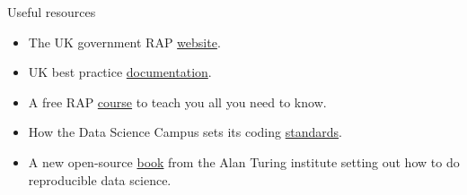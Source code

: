 \documentclass[xcolor=x11names,compress]{beamer}
\renewcommand{\(}{\begin{columns}}
\renewcommand{\)}{\end{columns}}
\newcommand{\<}[1]{\begin{column}{#1}}
\renewcommand{\>}{\end{column}}
\begin{document}

\begin{frame}{Useful resources}
  \begin{itemize}
    \item The UK government RAP \href{https://ukgovdatascience.github.io/rap-website/index.html}{website}.
    \item UK best practice \href{https://gss.civilservice.gov.uk/policy-store/quality-statistics-in-government/\#reproducible-analytical-pipelines-rap-}{documentation}.
    \item A free RAP \href{https://www.udemy.com/course/reproducible-analytical-pipelines/}{course} to teach you all you need to know.
    \item How the Data Science Campus sets its coding \href{https://datasciencecampus.github.io/coding-standards/}{standards}.
    \item A new open-source \href{https://the-turing-way.netlify.com}{book} from the Alan Turing institute setting out how to do reproducible data science.
  \end{itemize}
\end{frame}

%
%
%
\end{document}

